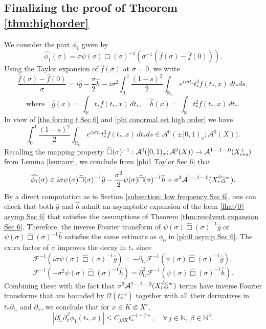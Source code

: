 \documentclass[10pt,a4paper,reqno]{amsart}
\newcommand{\RR}{\mathbb{R}}
\newcommand{\A}{\mathcal{A}}
\newcommand{\pa}{\partial}
\let\pminus\pm
\renewcommand{\pm}{\phi_{\le m}}
\theoremstyle{definition}
\theoremstyle{remark}
\numberwithin{equation}{section}
\newcommand{\ts}{t_*}
\newcommand{\wh}{\widehat}
\begin{document}
\subsection{Finalizing the proof of Theorem \ref{thm:highorder}}
We consider the part $\phi_1$ given by
\[
    \widehat{\phi_1}(\sigma) = \sigma\psi(\sigma)\wh\Box(\sigma)^{-1}(\sigma^{-1}(\wh{f}(\sigma)-\wh{f}(0))).
\]
Using the Taylor expansion of $\wh{f}(\sigma)$ at $\sigma=0$, we write 
\begin{equation}
\label{phi1 Taylor Sec 6}
    \frac{\widehat{f}(\sigma)-\widehat{f}(0)}{\sigma} = i\wh{g} -\frac{\sigma}{2}\wh{h} - i\sigma^2\int_0^1 \frac{(1-s)^2}{2}\int_{\RR_{\ts}} e^{i s\sigma\ts} \ts^3 f(\ts,x)\,d\ts ds,
\end{equation}
\[
\text{where}\quad \wh{g}(x) = \int_{\RR} \ts f(\ts,x)\,d\ts,\quad \wh{h}(x) = \int_{\RR} \ts^2 f(\ts,x)\,d\ts.
\]
In view of \eqref{the forcing f Sec 6} and \eqref{phi conormal est high order} we have
\[
    \int_0^1 \frac{(1-s)^2}{2}\int_{\RR_{\ts}} e^{i s\sigma\ts} \ts^3 f(\ts,x)\,d\ts ds \in \A^0(\pminus[0,1)_\sigma;\A^3(X)).
\]
Recalling the mapping property $\wh\Box(\sigma)^{-1} : \A^0([0,1)_\sigma;\A^{3}(X)) \to \A^{1-,1-,0}(X_{\rm{res}}^+)$ from Lemma \ref{lem:aux}, we conclude from \eqref{phi1 Taylor Sec 6} that
\[
    \wh{\phi_1}(\sigma) \in i\sigma\psi(\sigma)\wh\Box(\sigma)^{-1}\wh{g} - \frac{\sigma^2}{2}\psi(\sigma)\wh\Box(\sigma)^{-1}\wh{h} + \sigma^3 \A^{1-,1-,0}(X_{\rm{res}}^{\pminus}) .
\]
By a direct computation as in Section \ref{subsection: low frequency Sec 6}, one can check that both $\wh{g}$ and $\wh{h}$ admit an asymptotic expansion of the form \eqref{fhat(0) asymp Sec 6} that satisfies the assumptions of Theorem \ref{thm:resolvent expansion Sec 6}. Therefore, the inverse Fourier transform of $\psi(\sigma)\wh\Box(\sigma)^{-1}\wh{g}$ or $\psi(\sigma)\wh\Box(\sigma)^{-1}\wh{h}$ satisfies the same estimate as $\phi_0$ in \eqref{phi0 asymp Sec 6}. The extra factor of $\sigma$ improves the decay in $\ts$ since
\[
    \mathcal{F}^{-1}(i\sigma\psi(\sigma)\wh\Box(\sigma)^{-1} \wh{g})
    = -\pa_{\ts}\mathcal{F}^{-1}(\psi(\sigma)\wh\Box(\sigma)^{-1} \wh{g}),
\]
\[
    \mathcal{F}^{-1}(-\sigma^2\psi(\sigma)\wh\Box(\sigma)^{-1} \wh{h})
    = \pa_{\ts}^2 \mathcal{F}^{-1}(\psi(\sigma)\wh\Box(\sigma)^{-1} \wh{h}) .
\]
Combining these with the fact that $\sigma^3 \A^{1-,1-,0}(X_{\rm{res}}^{\pminus})$ terms have inverse Fourier transforms that are bounded by $\mathcal{O}(\ts^{-4})$ together with all their derivatives in $\ts\pa_{\ts}$ and $\pa_x$, we conclude that for $x\in K\Subset X^\circ$,
\begin{equation}
\label{phi1 asymp Sec 6}
    |\pa_{\ts}^j \pa_x^\beta \phi_1 (\ts,x)|\leq C_{j\beta K} t_*^{-4-j+},\quad \forall\, j\in\mathbb{N},\ \beta\in\mathbb{N}^3 .
\end{equation} 
\end{document}
